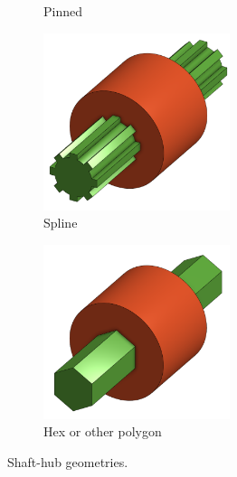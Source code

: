 \begin{figure}[H]
\begin{subfigure}[b]{.32\linewidth}
			\caption{Pinned}
		\end{subfigure}
		\begin{subfigure}[b]{.32\linewidth}
			\includegraphics[width=0.6\textwidth]{imgs/splineshaft.png}
			\caption{Spline}
		\end{subfigure}
		\begin{subfigure}[b]{.32\linewidth}
			\includegraphics[width=0.6\textwidth]{imgs/hexshaft.png}
			\caption{Hex or other polygon}
		\end{subfigure}
		
		\caption{Shaft-hub geometries.}
	\end{figure}
